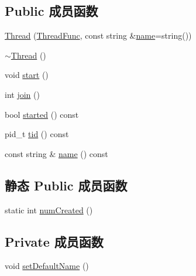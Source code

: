 \subsection*{Public 成员函数}
\begin{DoxyCompactItemize}
\item 
\hyperlink{classmuduo_1_1Thread_a2c3b1a6d86c989182ca7a9bb1aba48b3}{Thread} (\hyperlink{classmuduo_1_1Thread_a72bd31ac00c06074792e7cff0c8e3022}{Thread\+Func}, const string \&\hyperlink{classmuduo_1_1Thread_a47f4f0a66d5a539e687100dc65462ced}{name}=string())
\item 
\hyperlink{classmuduo_1_1Thread_a87a9c69a69ee4b13cb1ec5772f6d32ad}{$\sim$\+Thread} ()
\item 
void \hyperlink{classmuduo_1_1Thread_a60de64d75454385b23995437f1d72669}{start} ()
\item 
int \hyperlink{classmuduo_1_1Thread_ac942067a7e5a314610c1e89ff801f3bd}{join} ()
\item 
bool \hyperlink{classmuduo_1_1Thread_ae64a8595ddd43477f87ff91d9f051058}{started} () const
\item 
pid\+\_\+t \hyperlink{classmuduo_1_1Thread_a1cab09936ca9d7d85a156634a27f8be4}{tid} () const
\item 
const string \& \hyperlink{classmuduo_1_1Thread_a47f4f0a66d5a539e687100dc65462ced}{name} () const
\end{DoxyCompactItemize}
\subsection*{静态 Public 成员函数}
\begin{DoxyCompactItemize}
\item 
static int \hyperlink{classmuduo_1_1Thread_a2191877eb828575b4a698e5b1009923d}{num\+Created} ()
\end{DoxyCompactItemize}
\subsection*{Private 成员函数}
\begin{DoxyCompactItemize}
\item 
void \hyperlink{classmuduo_1_1Thread_a7ac088202ebd97d9b4f69b46341a3142}{set\+Default\+Name} ()
\end{DoxyCompactItemize}
